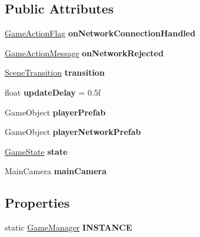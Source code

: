 \subsection*{Public Attributes}
\begin{DoxyCompactItemize}
\item 
\hypertarget{class_game_manager_a87d481fe88a1765f436ea5764cd1a21a}{\hyperlink{class_game_manager_1_1_game_action_flag}{Game\-Action\-Flag} {\bfseries on\-Network\-Connection\-Handled}}\label{class_game_manager_a87d481fe88a1765f436ea5764cd1a21a}

\item 
\hypertarget{class_game_manager_af977df043b83671ab9a4753b90fbf75b}{\hyperlink{class_game_manager_1_1_game_action_message}{Game\-Action\-Message} {\bfseries on\-Network\-Rejected}}\label{class_game_manager_af977df043b83671ab9a4753b90fbf75b}

\item 
\hypertarget{class_game_manager_abae15982d4eb90ef9e5f3d24d15e22f2}{\hyperlink{class_scene_transition}{Scene\-Transition} {\bfseries transition}}\label{class_game_manager_abae15982d4eb90ef9e5f3d24d15e22f2}

\item 
\hypertarget{class_game_manager_a4783d964ba3d7bf89b0142286d745014}{float {\bfseries update\-Delay} = 0.\-5f}\label{class_game_manager_a4783d964ba3d7bf89b0142286d745014}

\item 
\hypertarget{class_game_manager_a57d400c7a28f42865048fbdbaf236cfb}{Game\-Object {\bfseries player\-Prefab}}\label{class_game_manager_a57d400c7a28f42865048fbdbaf236cfb}

\item 
\hypertarget{class_game_manager_aeca2fe86e0abba27ebac921e0fd193ab}{Game\-Object {\bfseries player\-Network\-Prefab}}\label{class_game_manager_aeca2fe86e0abba27ebac921e0fd193ab}

\item 
\hypertarget{class_game_manager_a8d86b330237462e38933b28276ed0e2c}{\hyperlink{class_game_state}{Game\-State} {\bfseries state}}\label{class_game_manager_a8d86b330237462e38933b28276ed0e2c}

\item 
\hypertarget{class_game_manager_aafd6b83529911d9e32cc4b79bd477d74}{Main\-Camera {\bfseries main\-Camera}}\label{class_game_manager_aafd6b83529911d9e32cc4b79bd477d74}

\end{DoxyCompactItemize}
\subsection*{Properties}
\begin{DoxyCompactItemize}
\item 
\hypertarget{class_game_manager_a5c1d1f77dd4a2668a47a75c934c87075}{static \hyperlink{class_game_manager}{Game\-Manager} {\bfseries I\-N\-S\-T\-A\-N\-C\-E}}\label{class_game_manager_a5c1d1f77dd4a2668a47a75c934c87075}

\end{DoxyCompactItemize}
